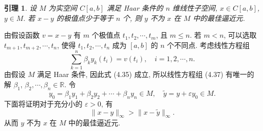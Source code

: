 \documentclass[openany]{ctexbook}
\makeatletter
\theoremstyle{kaiti}
\newtheorem{lemma}{引理}[section]
\theoremstyle{normal}
\renewenvironment{proof}[1][\proofname]{\par
    \pushQED{\qed}%
    \normalfont \topsep6\p@\@plus6\p@\relax
    \trivlist
    \item\relax
    {\heiti #1}\hspace{2\labelsep}\ignorespaces
  }{%
    \popQED\endtrivlist\@endpefalse
  }
\makeatother
\begin{document}
\begin{lemma}
设 $M$ 为实空间 $C[a, b]$ 满足 Haar 条件的 $n$ 维线性子空间, $x \in C[a, b]$, $y \in M$. 若 $x-y$ 的极值点少于等于 $n$ 个, 则 $y$ 不为 $x$ 在 $M$ 中的最佳逼近元.
\end{lemma}

\begin{proof}
由假设函数 $v=x-y$ 有 $m$ 个极值点 $t_1, t_2, \cdots, t_m$, 且 $m \leqslant n$. 若 $m<n$, 可以选取 $t_{m+1}, t_{m+2}, \cdots, t_n$, 使得 $t_1, t_2, \cdots, t_n$ 成为 $[a, b]$ 的 $n$ 个不同点. 考虑线性方程组
\begin{equation}
  \sum_{k=1}^n \beta_{k} y_{k}\left(t_{i}\right)=v\left(t_{i}\right), \quad i=1,2, \cdots, n.
\end{equation}
由假设 $M$ 满足 Haar 条件, 因此式 (4.35) 成立, 所以线性方程组 (4.37) 有唯一的解 $\beta_1$, $\beta_2, \cdots, \beta_n \in \mathbb{R}$. 令
$$
y_0=\beta_1 y_1+\beta_2 y_2+\cdots+\beta_n y_n \in M, \quad \tilde{y}=y+\varepsilon y_0 \in M.
$$
下面将证明对于充分小的 $\varepsilon>0$, 有
\begin{equation}
  \|x-y\|_{\infty}>\|x-\tilde{y}\|_{\infty}.
\end{equation}
从而 $y$ 不为 $x$ 在 $M$ 中的最佳逼近元.


\end{proof}
\end{document}
